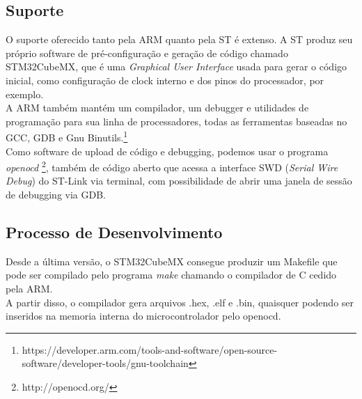 \documentclass[11pt,a4paper]{report}
\begin{document}
	\subsection{Suporte}
	O suporte oferecido tanto pela ARM quanto pela ST é extenso. A ST produz seu próprio software de pré-configuração e geração de código chamado STM32CubeMX, que é uma {\it Graphical User Interface} usada para gerar o código inicial, como configuração de clock interno e dos pinos do processador, por exemplo.\\
	
	A ARM também mantém um compilador, um debugger e utilidades de programação para sua linha de processadores, todas as ferramentas baseadas no GCC, GDB e Gnu Binutils.\footnote{https://developer.arm.com/tools-and-software/open-source-software/developer-tools/gnu-toolchain}\\
	
	Como software de upload de código e debugging, podemos usar o programa {\it openocd} \footnote{http://openocd.org/}, também de código aberto que acessa a interface SWD ({\it Serial Wire Debug}) do ST-Link via terminal, com possibilidade de abrir uma janela de sessão de debugging via GDB.
	
	\subsection{Processo de Desenvolvimento}
	Desde a última versão, o STM32CubeMX consegue produzir um Makefile que pode ser compilado pelo programa {\it make} chamando o compilador de C cedido pela ARM.\\
	
	A partir disso, o compilador gera arquivos .hex, .elf e .bin, quaisquer podendo ser inseridos na memoria interna do microcontrolador pelo openocd.\\
	
\end{document}
